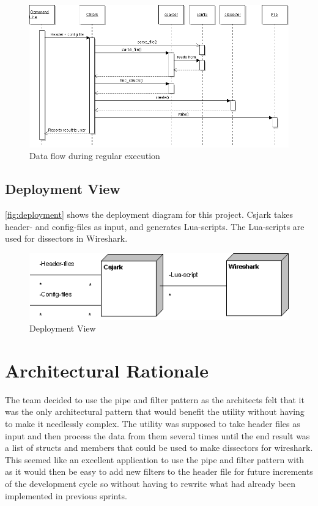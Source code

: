 \begin{figure}[htb]
	\includegraphics[width=\textwidth]{./planning/img/SequenceDiagram}
	\caption{Data flow during regular execution\label{fig:processview}}
\end{figure}


\subsection{Deployment View}
\autoref{fig:deployment} shows the deployment diagram for this project. Csjark takes header- and config-files as input, and generates Lua-scripts. The Lua-scripts are used for dissectors in Wireshark.

\begin{figure}[htb]
	\includegraphics[width = \textwidth]{./planning/img/Deployment}
	\caption{Deployment View\label{fig:deployment}}
\end{figure}


\section{Architectural Rationale}
The team decided to use the pipe and filter pattern as the architects felt that it was the only architectural pattern that would benefit the utility without having to make it needlessly complex. The utility was supposed to take header files as input and then process the data from them several times until the end result was a list of structs and members that could be used to make dissectors for wireshark. This seemed like an excellent application to use the pipe and filter pattern with as it would then be easy to add new filters to the header file for future increments of the development cycle so without having to rewrite what had already been implemented in previous sprints.

